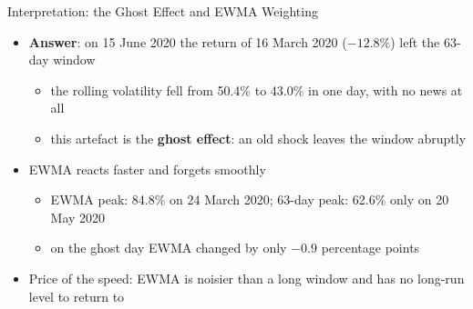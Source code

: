 \begin{frame}{Interpretation: the Ghost Effect and EWMA Weighting}
\itemsize{\small}
\begin{itemize}
    \item \textbf{Answer}: on 15 June 2020 the return of 16 March 2020 ($-12.8\%$) left the 63-day window
    \begin{itemize}
        \item the rolling volatility fell from 50.4\% to 43.0\% in one day, with no news at all
        \item this artefact is the \textbf{ghost effect}: an old shock leaves the window abruptly
    \end{itemize}
    \item EWMA reacts faster and forgets smoothly
    \begin{itemize}
        \item EWMA peak: 84.8\% on 24 March 2020; 63-day peak: 62.6\% only on 20 May 2020
        \item on the ghost day EWMA changed by only $-0.9$ percentage points
    \end{itemize}
    \item Price of the speed: EWMA is noisier than a long window and has no long-run level to return to
\end{itemize}
\end{frame}


